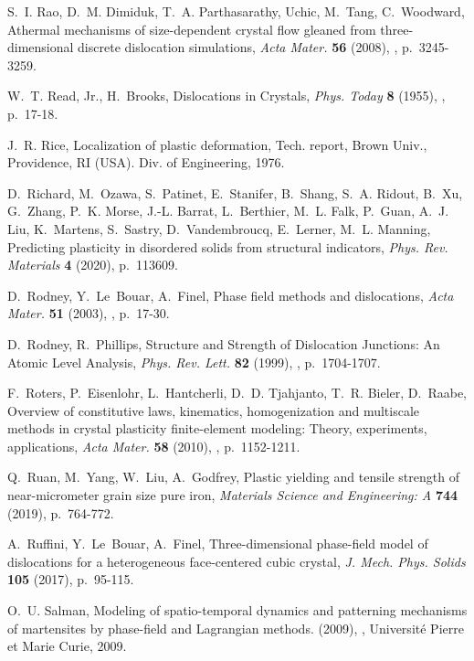 \documentclass[CRPHYS,Unicode,manuscript]{cedram}
\begin{document}
\begin{thebibliography}{100}
S.~I. Rao, D.~M. Dimiduk, T.~A. Parthasarathy, {Uchic}, M.~Tang, C.~Woodward,
  {\og Athermal mechanisms of size-dependent crystal flow gleaned from
  three-dimensional discrete dislocation simulations\fg}, \emph{Acta Mater.}
  \textbf{56} (2008), , p.~3245-3259.

W.~T. Read, Jr., H.~Brooks, {\og Dislocations in Crystals\fg}, \emph{Phys.
  Today} \textbf{8} (1955), , p.~17-18.

J.~R. Rice, {\og Localization of plastic deformation\fg}, Tech. report, Brown
  Univ., Providence, RI (USA). Div. of Engineering, 1976.

D.~Richard, M.~Ozawa, S.~Patinet, E.~Stanifer, B.~Shang, S.~A. Ridout, B.~Xu,
  G.~Zhang, P.~K. Morse, J.-L. Barrat, L.~Berthier, M.~L. Falk, P.~Guan, A.~J.
  Liu, K.~Martens, S.~Sastry, D.~Vandembroucq, E.~Lerner, M.~L. Manning, {\og
  Predicting plasticity in disordered solids from structural indicators\fg},
  \emph{Phys. Rev. Materials} \textbf{4} (2020), p.~113609.

D.~Rodney, Y.~Le~Bouar, A.~Finel, {\og Phase field methods and
  dislocations\fg}, \emph{Acta Mater.} \textbf{51} (2003), ,
  p.~17-30.

D.~Rodney, R.~Phillips, {\og Structure and Strength of Dislocation Junctions:
  An Atomic Level Analysis\fg}, \emph{Phys. Rev. Lett.} \textbf{82} (1999),
  , p.~1704-1707.

F.~Roters, P.~Eisenlohr, L.~Hantcherli, D.~D. Tjahjanto, T.~R. Bieler,
  D.~Raabe, {\og Overview of constitutive laws, kinematics, homogenization and
  multiscale methods in crystal plasticity finite-element modeling: Theory,
  experiments, applications\fg}, \emph{Acta Mater.} \textbf{58} (2010),
  , p.~1152-1211.

Q.~Ruan, M.~Yang, W.~Liu, A.~Godfrey, {\og Plastic yielding and tensile
  strength of near-micrometer grain size pure iron\fg}, \emph{Materials Science
  and Engineering: A} \textbf{744} (2019), p.~764-772.

A.~Ruffini, Y.~Le~Bouar, A.~Finel, {\og Three-dimensional phase-field model of
  dislocations for a heterogeneous face-centered cubic crystal\fg}, \emph{J.
  Mech. Phys. Solids} \textbf{105} (2017), p.~95-115.

O.~U. Salman, {\og Modeling of spatio-temporal dynamics and patterning
  mechanisms of martensites by phase-field and Lagrangian methods. (2009)\fg},
  \cdrphdthesisname, Universit{\'e} Pierre et Marie Curie, 2009.


\end{thebibliography}
\end{document}
